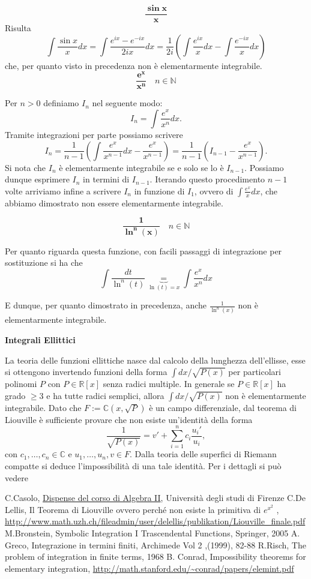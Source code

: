 \documentclass[10pt,oneside]{article}
\theoremstyle{definition}
\theoremstyle{plain}
\theoremstyle{definition}
\theoremstyle{plain}
\theoremstyle{plain}
\newcommand{\N}{\mathbb{N}}
\newcommand{\R}{\mathbb{R}}
\newcommand{\C}{\mathbb{C}}
\begin{document}
\[ \bm{\frac{\sin{x}}{x}} \]
Risulta 
\[ \int \frac{\sin{x}}{x} dx= \int \frac{e^{ix}-e^{-ix}}{2ix} dx = \frac{1}{2i} \left( \int \frac{e^{ix}}{x}dx - \int \frac{e^{-ix}}{x}dx \right)\]
che, per quanto visto in precedenza non è elementarmente integrabile.
 \[ \bm{\frac{e^x}{x^n}} \quad n \in \N \] 

Per $n>0$ definiamo $I_n$ nel seguente modo:
\[I_n=\int \frac{e^x}{x^n} dx .\]
Tramite integrazioni per parte possiamo scrivere 
\[I_n= \frac{1}{n-1} \left(\int \frac{e^x}{x^{n-1}}dx - \frac{e^x}{x^{n-1}} \right)= \frac{1}{n-1} \left(I_{n-1}-\frac{e^x}{x^{n-1}} \right). \]
Si nota che $I_n$ è elementarmente integrabile se e solo se lo è $I_{n-1}$. Possiamo dunque esprimere $I_{n}$ in termini di $I_{n-1}$. Iterando questo procedimento $n-1$ volte arriviamo infine a scrivere $I_n$ in funzione di $I_1$, ovvero di $\int \frac{e^x}{x}dx$, che abbiamo dimostrato non essere elementarmente integrabile.


\[ \bm{\frac{1}{\ln^n(x)}} \quad n \in \N\]

Per quanto riguarda questa funzione, con facili passaggi di integrazione per sostituzione si ha che
\[\int \frac{dt}{\ln^n(t)}\underbrace{=}_{\ln(t)=x} \int \frac{e^x}{x^n}dx \]
 
E dunque, per quanto dimostrato in precedenza,  anche $\frac{1}{\ln^n(x)}$ non è elementarmente integrabile.

\begin{center}
\textbf{Integrali Ellittici}
\end{center}

La teoria delle funzioni ellittiche nasce dal calcolo della lunghezza dell'ellisse, esse si ottengono invertendo funzioni della forma $\int dx/\sqrt{P(x)} $ per particolari polinomi $P$ con $P\in \R[x]$ senza radici multiple. In generale se $P \in \R[x]$ ha grado $\ge 3$ e ha tutte radici semplici, allora $\int dx/\sqrt{P(x)}$ non è elementarmente integrabile. Dato che $F:=\C(x,\sqrt{P})$ è un campo differenziale, dal teorema di Liouville è sufficiente provare che non esiste un'identità della forma
\[\frac{1}{\sqrt{P(x)}}= v' + \sum_{i=1}^n c_i \frac{u_i'}{u_i}, \]
con $c_1,\dots, c_n \in \C$ e $u_1,\dots, u_n, v \in F$. Dalla teoria delle superfici di Riemann compatte si deduce l'impossibilità di una tale identità. Per i dettagli si può vedere \cite{Con}
\begin{thebibliography}{10}
 C.Casolo, \href{http://web.math.unifi.it/users/casolo/dispense/algebra2_2015.pdf}{Dispense del corso di Algebra II}, Università degli studi di Firenze
 C.De Lellis, Il Teorema di Liouville ovvero perché non esiste la primitiva di $e^{x^2}$ , \url{http://www.math.uzh.ch/fileadmin/user/delellis/publikation/Liouville_finale.pdf}
 M.Bronstein, Symbolic Integration I Trascendental Functions, Springer, 2005
 A. Greco, Integrazione in termini finiti, Archimede  Vol 2 ,(1999), 82-88
 R.Risch,  The problem of integration in finite terms, 1968
 B. Conrad, Impossibility theorems for elementary integration, \url{http://math.stanford.edu/~conrad/papers/elemint.pdf}
\end{thebibliography}
\end{document}
